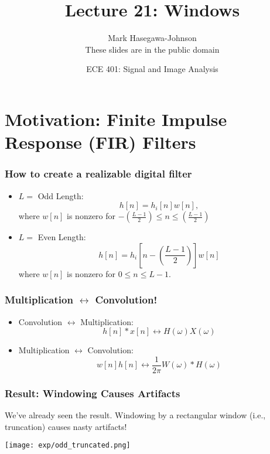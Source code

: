 \documentclass{beamer}
\title{Lecture 21: Windows}
\author{Mark Hasegawa-Johnson\\These slides are in the public domain}
\date{ECE 401: Signal and Image Analysis}
\begin{document}
\begin{frame}
  \maketitle
\end{frame}

\begin{frame}
  \tableofcontents
\end{frame}

\section[Motivation]{Motivation: Finite Impulse Response (FIR) Filters}
\setcounter{subsection}{1}

\begin{frame}
  \frametitle{How to create a realizable digital filter}
  \begin{itemize}
  \item $L=$ Odd Length:
    \[
    h[n] = h_{i}[n]w[n],
    \]
    where $w[n]$ is nonzero for $-\left(\frac{L-1}{2}\right)\le n\le
    \left(\frac{L-1}{2}\right)$
  \item $L=$ Even Length:
    \[
    h[n] = h_{i}\left[n-\left(\frac{L-1}{2}\right)\right]w[n]
    \]
    where $w[n]$ is nonzero for $0\le n\le L-1$.
  \end{itemize}
\end{frame}

\begin{frame}
  \frametitle{Multiplication $\leftrightarrow$ Convolution!}

  \begin{itemize}
  \item Convolution $\leftrightarrow$ Multiplication:
    \begin{displaymath}
      h[n] \ast x[n] \leftrightarrow H(\omega)X(\omega)
    \end{displaymath}
  \item Multiplication $\leftrightarrow$ Convolution:
    \begin{displaymath}
      w[n]h[n] \leftrightarrow \frac{1}{2\pi}W(\omega)\ast H(\omega)
    \end{displaymath}
  \end{itemize}
\end{frame}

\begin{frame}
  \frametitle{Result: Windowing Causes Artifacts}

  We've already seen the result.  Windowing by a rectangular window
  (i.e., truncation) causes nasty artifacts!

  \centerline{\texttt{[image: exp/odd\_truncated.png]}}
\end{frame}
\end{document}

